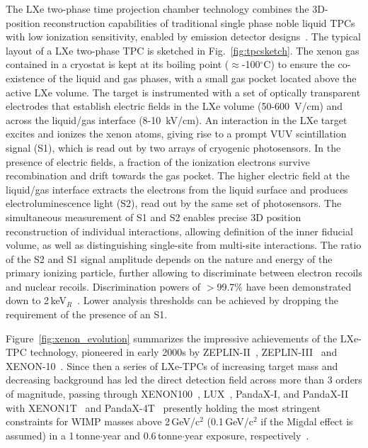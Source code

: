 The LXe two-phase time projection chamber technology combines the 3D-position reconstruction capabilities of traditional single phase noble liquid TPCs~\cite{Rubbia:1977zz} with low ionization sensitivity, enabled by emission detector designs~\cite{osti_4101722}. The typical layout of a LXe two-phase TPC is sketched in Fig.~\ref{fig:tpcsketch}. The xenon gas contained in a cryostat is kept at its boiling point ($\approx$-100$^\circ$C) to ensure the co-existence of the liquid and gas phases, with a small gas pocket located above the active LXe volume. The target is instrumented with a set of optically transparent electrodes that establish electric fields in the LXe volume (50-600~V/cm) and across the liquid/gas interface (8-10~kV/cm). An interaction in the LXe target excites and ionizes the xenon atoms, giving rise to a prompt VUV scintillation signal (S1), which is read out by two arrays of cryogenic photosensors. In the presence of electric fields, a fraction of the ionization electrons survive recombination and drift towards the gas pocket. The higher electric field at the liquid/gas interface extracts the electrons from the liquid surface and produces electroluminescence light (S2), read out by the same set of photosensors. The simultaneous measurement of S1 and S2 enables precise 3D position reconstruction of individual interactions, allowing definition of the inner fiducial volume, as well as distinguishing single-site from multi-site interactions. The ratio of the S2 and S1 signal amplitude depends on the nature and energy of the primary ionizing particle, further allowing to discriminate between electron recoils and nuclear recoils. Discrimination powers of $>$99.7\% have been demonstrated down to 2\,keV$_R$~\cite{LUX:2020car}. Lower analysis thresholds can be achieved by dropping the requirement of the presence of an S1.

Figure~\ref{fig:xenon_evolution} summarizes the impressive achievements of the LXe-TPC technology, pioneered in early 2000s by ZEPLIN-II~\cite{ALNER2007287}, ZEPLIN-III~\cite{Akimov:2011tj} and XENON-10~\cite{XENON10:2011prx}. Since then a series of LXe-TPCs of increasing target mass and decreasing background has led the direct detection field across more than 3 orders of magnitude, passing through XENON100~\cite{APRILE2012573}, LUX~\cite{AKERIB2013111}, PandaX-I, and PandaX-II~\cite{pandax} with  XENON1T~\cite{xenon1t} and PandaX-4T~\cite{PandaX-4T:2021bab} presently holding the most stringent constraints for WIMP masses above 2\,GeV/c$^2$ (0.1\,GeV/c$^2$ if the Migdal effect is assumed) in a 1\,tonne$\cdot$year and 0.6\,tonne$\cdot$year exposure, respectively~\cite{PhysRevLett.123.251801, PhysRevLett.123.241803,PandaX-4T:2021bab}.

